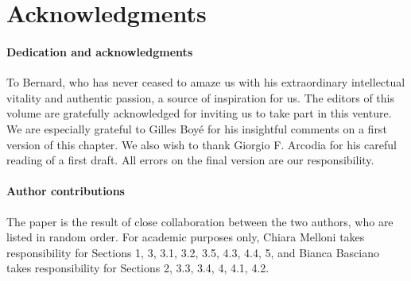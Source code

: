 \documentclass[output=paper]{langsci/langscibook}
\begin{document}
\section*{Acknowledgments}

\paragraph*{Dedication
  and acknowledgments} To Bernard, who has never ceased to amaze us
  with his extraordinary intellectual vitality and authentic passion, a
  source of inspiration for us. The editors of this volume are
  gratefully acknowledged for inviting us to take part in this venture.
  We are especially grateful to Gilles Boyé for his insightful comments
  on a first version of this chapter. We also wish to thank Giorgio F.
  Arcodia for his careful reading of a first draft. All errors on the
  final version are our responsibility.

\paragraph*{Author
  contributions} The paper is the result of close collaboration between
  the two authors, who are listed in random order. For academic purposes
  only, Chiara Melloni takes responsibility for Sections 1, 3, 3.1, 3.2,
  3.5, 4.3, 4.4, 5, and Bianca Basciano takes responsibility for Sections
  2, 3.3, 3.4, 4, 4.1, 4.2.




{\sloppy
    \printbibliography[heading=subbibliography,notkeyword=this]
}
\end{document}
